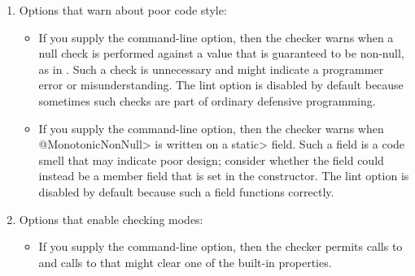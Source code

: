 \begin{enumerate}
\begin{itemize}
\item
  \label{nullness-AcheckEnclosingExpr}%
  If you supply the  command-line option, the soundness of
  the Nullness Initialization Checker is improved. In previous versions and without supplying the new flag,
  the uninitialized enclosing expression of an inner class instantiation cannot be detected, which is unsound.
  However, this option is by default disabled since it is strict and will result in many false positives.
  Use this flag to soundly handle the nullness of the enclosing expression for the inner class instantiation.
\end{itemize}

\item
  Options that warn about poor code style:

\begin{itemize}
\item
  \label{nullness-lint-nulltest}%
  If you supply the  command-line option, then the
  checker warns when a null check is performed against a value that is
  guaranteed to be non-null, as in .  Such a check is
  unnecessary and might indicate a programmer error or misunderstanding.
  The lint option is disabled by default because sometimes such checks are
  part of ordinary defensive programming.

\item
  \label{nullness-lint-monotonic}%
  If you supply the  command-line option,
  then the checker warns when \<@MonotonicNonNull> is written on a \<static>
  field.  Such a field is a code smell that may indicate poor design; consider
  whether the field could instead be a member field that is set in the
  constructor.  The lint option is disabled by default because such a field
  functions correctly.
\end{itemize}

\item
  Options that enable checking modes:

\begin{itemize}
\item
  If you supply the  command-line option,
  then the checker permits calls to
  and calls to
  that might clear one of the built-in properties.


\end{itemize}
\end{enumerate}
